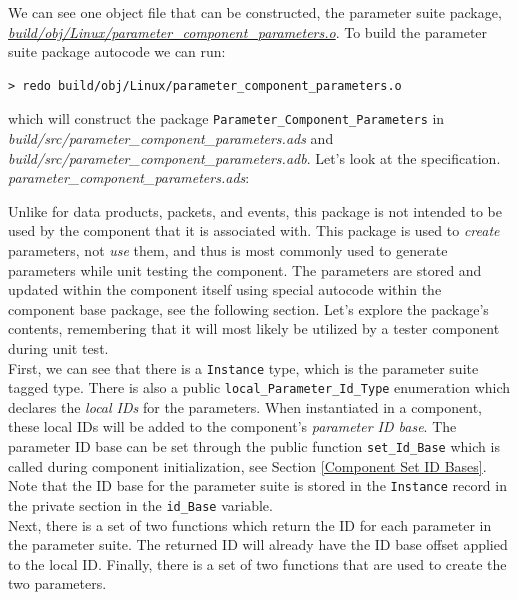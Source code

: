 We can see one object file that can be constructed, the parameter suite package, \textit{\url{build/obj/Linux/parameter\_component\_parameters.o}}. To build the parameter suite package autocode we can run:

\vspace{5mm} %
\begin{verbatim}
> redo build/obj/Linux/parameter_component_parameters.o
\end{verbatim}
\vspace{5mm} %

which will construct the package \texttt{Parameter\_Component\_Parameters} in \textit{build/src/parameter\_component\_parameters.ads} and \textit{build/src/parameter\_component\_parameters.adb}. Let's look at the specification. \\

\textit{parameter\_component\_parameters.ads}:

Unlike for data products, packets, and events, this package is not intended to be used by the component that it is associated with. This package is used to \textit{create} parameters, not \textit{use} them, and thus is most commonly used to generate parameters while unit testing the component. The parameters are stored and updated within the component itself using special autocode within the component base package, see the following section. Let's explore the package's contents, remembering that it will most likely be utilized by a tester component during unit test. \\

First, we can see that there is a \texttt{Instance} type, which is the parameter suite tagged type. There is also a public \texttt{local\_Parameter\_Id\_Type} enumeration which declares the \textit{local IDs} for the parameters. When instantiated in a component, these local IDs will be added to the component's \textit{parameter ID base}. The parameter ID base can be set through the public function \texttt{set\_Id\_Base} which is called during component initialization, see Section \ref{Component Set ID Bases}. Note that the ID base for the parameter suite is stored in the \texttt{Instance} record in the private section in the \texttt{id\_Base} variable. \\

Next, there is a set of two functions which return the ID for each parameter in the parameter suite. The returned ID will already have the ID base offset applied to the local ID. Finally, there is a set of two functions that are used to create the two parameters. \\

